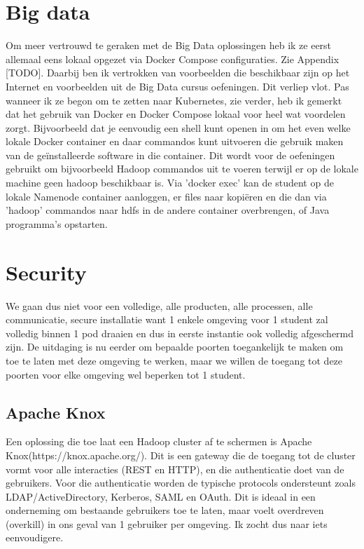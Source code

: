\section{Big data}

Om meer vertrouwd te geraken met de Big Data oplossingen heb ik ze eerst allemaal eens lokaal opgezet via Docker Compose configuraties. Zie Appendix [TODO].
Daarbij ben ik vertrokken van voorbeelden die beschikbaar zijn op het Internet en voorbeelden uit de Big Data cursus oefeningen.
\newline
\newline
Dit verliep vlot. Pas wanneer ik ze begon om te zetten naar Kubernetes, zie verder, heb ik gemerkt dat het gebruik van Docker en Docker Compose lokaal voor heel wat voordelen zorgt. Bijvoorbeeld dat je eenvoudig een shell kunt openen in om het even welke lokale Docker container en daar commandos kunt uitvoeren die gebruik maken van de geïnstalleerde software in die container. Dit wordt voor de oefeningen gebruikt om bijvoorbeeld Hadoop commandos uit te voeren terwijl er op de lokale machine geen hadoop beschikbaar is. Via 'docker exec' kan de student op de lokale Namenode container aanloggen, er files naar kopiëren en die dan via 'hadoop' commandos naar hdfs in de andere container overbrengen, of Java programma's opstarten.

\section{Security}

We gaan dus niet voor een volledige, alle producten, alle processen, alle communicatie, secure installatie want 1 enkele omgeving voor 1 student zal volledig binnen 1 pod draaien en dus in eerste instantie ook volledig afgeschermd zijn.
De uitdaging is nu eerder om bepaalde poorten toegankelijk te maken om toe te laten met deze omgeving te werken, maar we willen de toegang tot deze poorten voor elke omgeving wel beperken tot 1 student.

\subsection{Apache Knox}

Een oplossing die toe laat een Hadoop cluster af te schermen is Apache Knox\newline (https://knox.apache.org/). Dit is een gateway die de toegang tot de cluster vormt voor alle interacties (REST en HTTP), en die authenticatie doet van de gebruikers. Voor die authenticatie worden de typische protocols ondersteunt zoals LDAP/ActiveDirectory, Kerberos, SAML en OAuth. Dit is ideaal in een onderneming om bestaande gebruikers toe te laten, maar voelt overdreven (overkill) in ons geval van 1 gebruiker per omgeving. Ik zocht dus naar iets eenvoudigere.

